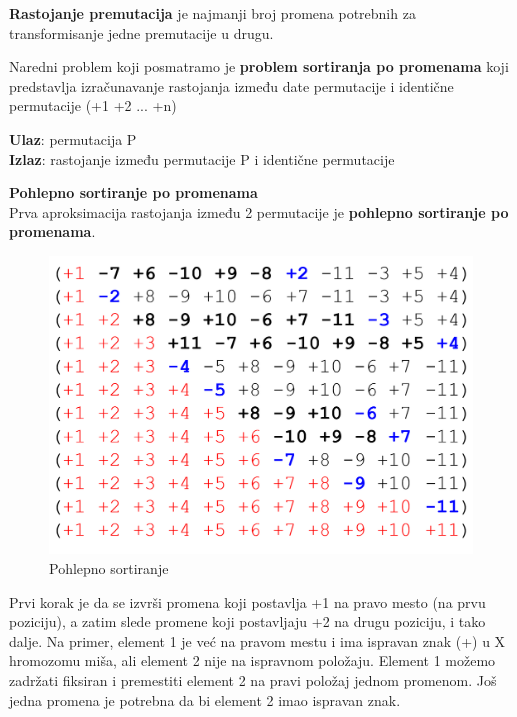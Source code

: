 \begin{definicija}{\textbf{Rastojanje premutacija} je najmanji broj promena potrebnih za transformisanje jedne premutacije u drugu.}
\end{definicija}

\noindent Naredni problem koji posmatramo je \textbf{problem sortiranja po promenama} koji predstavlja izračunavanje rastojanja između date permutacije i identične permutacije (+1 +2 ... +n)

\textbf{Ulaz}: permutacija P\\
\indent \textbf{Izlaz}: rastojanje između permutacije P i identične permutacije\\

\vspace{1cm}

\hspace{2cm} \textbf{Pohlepno sortiranje po promenama}\\

Prva aproksimacija rastojanja između 2 permutacije je \textbf{pohlepno sortiranje po promenama}.\\

\begin{figure}[h!]
\centering
\includegraphics[scale=0.4]{poglavlja/6/slike/greedy_sort.png}
\caption{Pohlepno sortiranje}
\label{slika:X}
\end{figure}

Prvi korak je da se izvrši promena koji postavlja +1 na pravo mesto (na prvu poziciju), a zatim slede promene koji postavljaju
+2 na drugu poziciju, i tako dalje. Na primer, element 1 je već na pravom mestu i ima ispravan znak (+) u X hromozomu miša, ali element 2 nije na ispravnom položaju. Element 1 možemo zadržati fiksiran i premestiti element 2 na pravi položaj jednom promenom. Još jedna promena je potrebna da bi element 2 imao ispravan znak.\\

